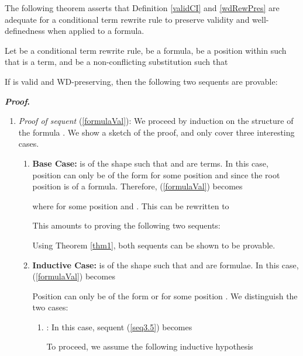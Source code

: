 \documentclass[copyright]{eptcs}
\begin{document}
The following theorem asserts that Definition \ref{validCI} and \ref{wdRewPres} are adequate for a conditional term rewrite rule to preserve validity and well-definedness when applied to a formula.
\begin{theorem}\label{thm2}
Let  be a conditional term rewrite rule,  be a formula,  be a position within  such that  is a term, and  be a non-conflicting substitution such that

If  is valid and WD-preserving, then the following two sequents are provable:

\end{theorem}
\noindent \textbf{\textit{Proof}. }
\begin{enumerate}
\item \textit{Proof of sequent} (\ref{formulaVal}): We proceed by induction on the structure of the formula . We show a sketch of the proof, and only cover three interesting cases.
\begin{enumerate}
\item \textbf{Base Case:}  is of the shape  such that  and  are terms. In this case, position  can only be of the form  for some position  and  since the root position is of a formula.
Therefore, (\ref{formulaVal}) becomes
\begin{small}

\end{small}
where  for some position  and . This can be rewritten to
\begin{small}

\end{small}
This amounts to proving the following two sequents:
\begin{small}

\end{small}
Using Theorem \ref{thm1}, both sequents can be shown to be provable.
\item \textbf{Inductive Case:}  is of the shape  such that  and  are formulae. In this case, (\ref{formulaVal}) becomes
\begin{small}

\end{small}
Position  can only be of the form  or  for some position . We distinguish the two cases:
\begin{enumerate}
\item : In this case, sequent (\ref{seq3.5}) becomes
\begin{small}

\end{small}
To proceed, we assume the following inductive hypothesis
\begin{small}


\end{small}
\end{enumerate}
\end{enumerate}
\end{enumerate}
\end{document}
